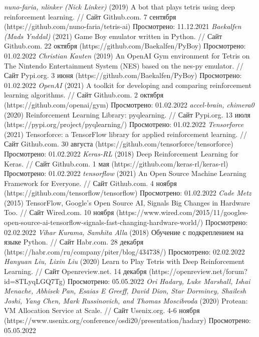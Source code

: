 \documentclass[draft]{article}
\begin{document}
\begin{center}
\begin{thebibliography}{}
 \textit{nuno-faria, nlinker (Nick Linker)} (2019) A bot that plays tetris using deep reinforcement learning. // Сайт Github.com. 7 сентября (https://github.com/nuno-faria/tetris-ai) Просмотрено: 11.12.2021
 \textit{Baekalfen (Mads Ynddal)} (2021) Game Boy emulator written in Python. // Сайт Github.com. 22 октября (https://github.com/Baekalfen/PyBoy) Просмотрено: 01.02.2022
 \textit{Christian Kauten} (2019) An OpenAI Gym environment for Tetris on The Nintendo Entertainment System (NES) based on the nes-py emulator. // Сайт Pypi.org. 3 июня (https://github.com/Baekalfen/PyBoy) Просмотрено: 01.02.2022
 \textit{OpenAI} (2021) A toolkit for developing and comparing reinforcement learning algorithms. // Сайт Github.com. 2 октября (https://github.com/openai/gym) Просмотрено: 01.02.2022
 \textit{accel-brain, chimera0} (2020) Reinforcement Learning Library: pyqlearning. // Сайт Pypi.org. 13 июля (https://pypi.org/project/pyqlearning/) Просмотрено: 01.02.2022
 \textit{Tensorforce} (2021) Tensorforce: a TensorFlow library for applied reinforcement learning. // Сайт Github.com. 30 августа (https://github.com/tensorforce/tensorforce) Просмотрено: 01.02.2022
 \textit{Keras-RL} (2018) Deep Reinforcement Learning for Keras. // Сайт Github.com. 1 мая (https://github.com/keras-rl/keras-rl) Просмотрено: 01.02.2022
 \textit{tensorflow} (2021) An Open Source Machine Learning Framework for Everyone. // Сайт Github.com. 4 ноября (https://github.com/tensorflow/tensorflow) Просмотрено: 01.02.2022
 \textit{Cade Metz} (2015) TensorFlow, Google's Open Source AI, Signals Big Changes in Hardware Too. // Сайт Wired.com. 10 ноября (https://www.wired.com/2015/11/googles-open-source-ai-tensorflow-signals-fast-changing-hardware-world/) Просмотрено: 02.02.2022
 \textit{Vihar Kurama, Samhita Alla} (2018) Обучение с подкреплением на языке Python. // Сайт Habr.com. 28 декабря (https://habr.com/ru/company/piter/blog/434738/) Просмотрено: 02.02.2022
 \textit{Hanyuan Liu, Lixin Liu} (2020) Learn to Play Tetris with Deep Reinforcement Learning. // Сайт Openreview.net. 14 декабря (https://openreview.net/forum?id=8TLyqLGQ7Tg) Просмотрено: 05.05.2022
 \textit{Ori Hadary, Luke Marshall, Ishai Menache, Abhisek Pan, Esaias E Greeff, David Dion, Star Dorminey, Shailesh Joshi, Yang Chen, Mark Russinovich, and Thomas Moscibroda} (2020) Protean: VM Allocation Service at Scale. // Сайт Usenix.org. 4-6 ноября (https://www.usenix.org/conference/osdi20/presentation/hadary) Просмотрено: 05.05.2022

\end{thebibliography}
\end{center}
\end{document}
